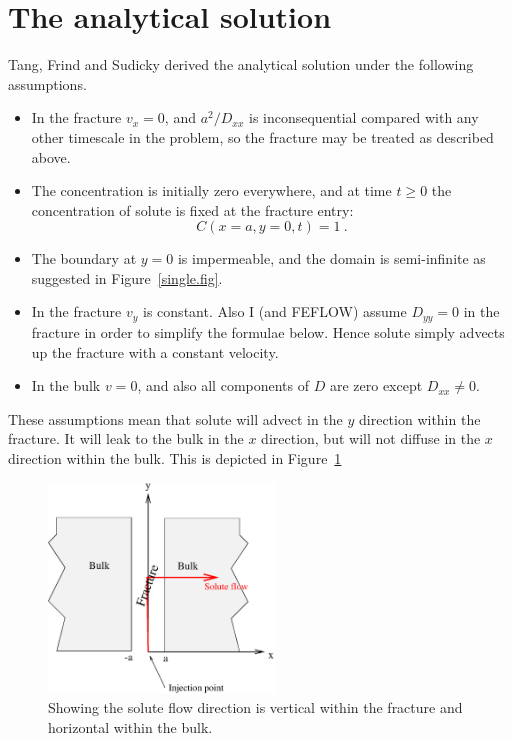 \documentclass[]{scrreprt}
\begin{document}
\section{The analytical solution}

Tang, Frind and Sudicky derived the analytical solution under the
following assumptions.
\begin{itemize}
\item In the fracture $v_{x} = 0$, and $a^{2}/D_{xx}$ is
  inconsequential compared with any other timescale in the problem, so
  the fracture may be treated as described above.
\item The concentration is initially zero everywhere, and at time
  $t\geq 0$ the concentration of solute is fixed at the fracture entry:
\begin{equation}
C(x=a, y=0, t) = 1 \ .
\end{equation}
\item The boundary at $y=0$ is impermeable, and the domain is
  semi-infinite as suggested in Figure~\ref{single.fig}.
\item In the fracture $v_{y}$ is constant.  Also I (and FEFLOW) assume
  $D_{yy}=0$ in the fracture in order to simplify the formulae below.
  Hence solute simply advects up the fracture with a constant
  velocity.
\item In the bulk $v=0$, and also all components of $D$ are zero
  except $D_{xx}\neq 0$.
\end{itemize}
These assumptions mean that solute will advect in the $y$ direction
within the fracture.  It will leak to the bulk in the $x$ direction,
but will not diffuse in the $x$ direction within the bulk.  This is
depicted in Figure~\ref{single_flow.fig}

\begin{figure}[htb]
\centering
\includegraphics[width=6cm]{single_flow.eps}
\caption{Showing the solute flow direction is vertical within the
  fracture and horizontal within the bulk.}
\label{single_flow.fig}
\end{figure}
\end{document}
